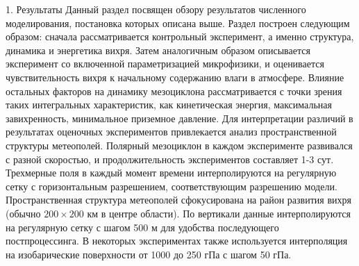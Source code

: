 1.	Результаты
Данный раздел посвящен обзору результатов численного моделирования, постановка которых описана выше. Раздел построен следующим образом: сначала рассматривается контрольный эксперимент, а именно структура, динамика и энергетика вихря. Затем аналогичным образом описывается эксперимент со включенной параметризацией микрофизики, и оценивается чувствительность вихря к начальному содержанию влаги в атмосфере.
Влияние остальных факторов на динамику мезоциклона рассматривается с точки зрения таких интегральных характеристик, как кинетическая энергия, максимальная завихренность, минимальное приземное давление. Для интерпретации различий в результатах оценочных экспериментов привлекается анализ пространственной структуры метеополей.
Полярный мезоциклон в каждом эксперименте развивался с разной скоростью, и продолжительность экспериментов составляет 1-3 сут. Трехмерные поля в каждый момент времени интерполируются на регулярную сетку с горизонтальным разрешением, соответствующим разрешению модели. Пространственная структура метеополей сфокусирована на район развития вихря (обычно $200\times 200$ км в центре области). По вертикали данные интерполируются на регулярную сетку с шагом 500 м для удобства последующего постпроцессинга. В некоторых экспериментах также используется интерполяция на изобарические поверхности от 1000 до 250 гПа с шагом 50 гПа.

